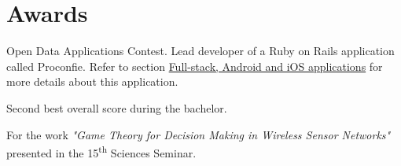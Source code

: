 \section{Awards}\label{sec:awards}

	{Open Data Applications Contest. Lead developer of a Ruby on Rails application called Proconfie. Refer to section \hyperref[sec:web_app]{Full-stack, Android and iOS applications} for more details about this application.}

	{Second best overall score during the bachelor.}

	{For the work \emph{"Game Theory for Decision Making in Wireless Sensor Networks"} presented in the 15\textsuperscript{th} Sciences Seminar.}
